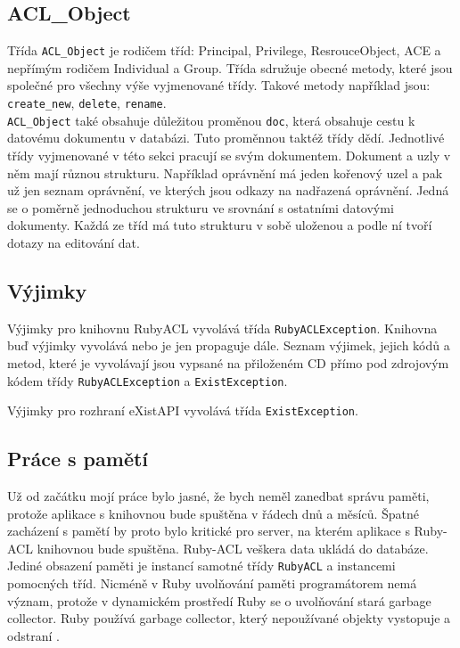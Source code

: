
\subsection{ACL\_Object}
Třída \verb|ACL_Object| je rodičem tříd: Principal, Privilege, ResrouceObject, ACE a nepřímým rodičem Individual a Group.
Třída sdružuje obecné metody, které jsou společné pro všechny výše vyjmenované třídy. Takové metody například jsou: \verb|create_new|, \verb|delete|, \verb|rename|. \\ \verb|ACL_Object| také obsahuje důležitou proměnou \verb|doc|, která obsahuje cestu k datovému dokumentu v databázi. Tuto proměnnou taktéž třídy dědí.
Jednotlivé třídy vyjmenované v této sekci pracují se svým dokumentem. Dokument a uzly v něm mají různou strukturu. Například oprávnění má jeden kořenový uzel a pak už jen seznam oprávnění, ve kterých jsou odkazy na nadřazená oprávnění. Jedná se o poměrně jednoduchou strukturu ve srovnání s ostatními datovými dokumenty. Každá ze tříd má tuto strukturu v sobě uloženou a podle ní tvoří dotazy na editování dat.


\subsection{Výjimky}
Výjimky pro knihovnu RubyACL vyvolává třída \verb|RubyACLException|. Knihovna buď výjimky vyvolává nebo je jen propaguje dále. Seznam výjimek, jejich kódů a metod, které je vyvolávají jsou vypsané na přiloženém CD přímo pod zdrojovým kódem třídy \verb|RubyACLException| a \verb|ExistException|.

\noindent Výjimky pro rozhraní eXistAPI vyvolává třída \verb|ExistException|.


\subsection{Práce s pamětí}
Už od začátku mojí práce bylo jasné, že bych neměl zanedbat správu paměti, protože aplikace s knihovnou bude spuštěna v řádech dnů a měsíců. Špatné zacházení s pamětí by proto bylo kritické pro server, na kterém aplikace s Ruby-ACL knihovnou bude spuštěna. Ruby-ACL veškera data ukládá do databáze. Jediné obsazení paměti je instancí samotné třídy \verb|RubyACL| a instancemi pomocných tříd. Nicméně v Ruby uvolňování paměti programátorem nemá význam, protože v dynamickém prostředí Ruby se o uvolňování stará garbage collector. Ruby používá garbage collector, který nepoužívané objekty vystopuje a odstraní \cite{Ruby}.